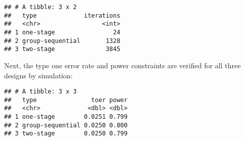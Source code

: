 \documentclass[
]{book}
\newenvironment{Shaded}{\begin{snugshade}}{\end{snugshade}}
\newcommand{\DataTypeTok}[1]{\textcolor[rgb]{0.13,0.29,0.53}{#1}}
\newcommand{\DecValTok}[1]{\textcolor[rgb]{0.00,0.00,0.81}{#1}}
\newcommand{\FloatTok}[1]{\textcolor[rgb]{0.00,0.00,0.81}{#1}}
\newcommand{\KeywordTok}[1]{\textcolor[rgb]{0.13,0.29,0.53}{\textbf{#1}}}
\newcommand{\NormalTok}[1]{#1}
\newcommand{\OperatorTok}[1]{\textcolor[rgb]{0.81,0.36,0.00}{\textbf{#1}}}
\newcommand{\StringTok}[1]{\textcolor[rgb]{0.31,0.60,0.02}{#1}}
\begin{document}
\begin{verbatim}
## # A tibble: 3 x 2
##   type             iterations
##   <chr>                 <int>
## 1 one-stage                24
## 2 group-sequential       1328
## 3 two-stage              3845
\end{verbatim}

Next, the type one error rate and power constraints are verified
for all three designs by simulation:

\begin{Shaded}
\end{Shaded}

\begin{verbatim}
## # A tibble: 3 x 3
##   type               toer power
##   <chr>             <dbl> <dbl>
## 1 one-stage        0.0251 0.799
## 2 group-sequential 0.0250 0.800
## 3 two-stage        0.0250 0.799
\end{verbatim}
\end{document}

